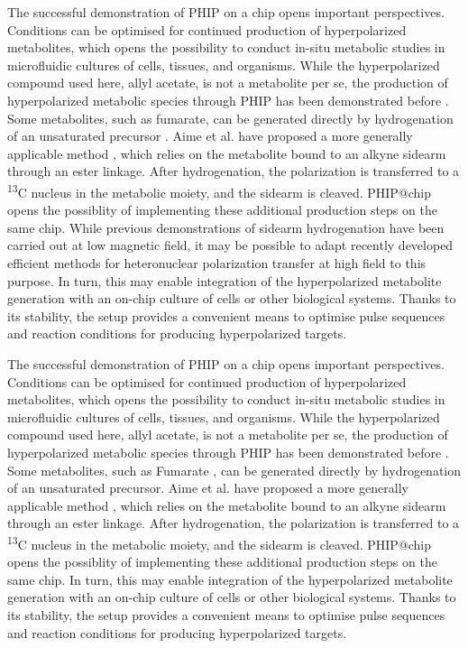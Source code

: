 The successful demonstration of PHIP on a chip opens important perspectives.
Conditions can be optimised for continued production of hyperpolarized metabolites,
which opens the possibility to conduct in-situ metabolic studies in microfluidic
cultures of cells, tissues, and organisms.
While the hyperpolarized compound used here, allyl acetate, is not
a metabolite per se, the production of hyperpolarized metabolic species
through PHIP has been demonstrated before \cite{cavallari201813,shchepin2014parahydrogen,reineri2015parahydrogen,Ripka:2018dc,Korchak:2018ga,hovener2018parahydrogen}.
Some metabolites, such as fumarate, can be
generated directly by hydrogenation
of an unsaturated precursor \cite{Ripka:2018dc}. Aime et al. have proposed a more generally
applicable method \cite{reineri2015parahydrogen}, which relies on the metabolite bound to an alkyne sidearm
through an ester linkage. After hydrogenation, the polarization is  transferred to a
\textsuperscript{13}C nucleus in the metabolic moiety, and the sidearm is
cleaved.  PHIP@chip opens the possiblity of implementing these additional
production steps on the same chip. While previous demonstrations of sidearm hydrogenation have been carried
out at low magnetic field, it may be possible to adapt recently developed
efficient methods for heteronuclear polarization transfer at
high field\cite{eills2017singlet} to this purpose.
In turn, this may enable integration
of the hyperpolarized metabolite generation with an on-chip culture
of cells or other biological systems.
Thanks to its stability,
the setup provides a convenient means to optimise pulse sequences
and reaction conditions for producing hyperpolarized targets.

The successful demonstration of PHIP on a chip opens important perspectives.
Conditions can be optimised for continued production of hyperpolarized metabolites,
which opens the possibility to conduct in-situ metabolic studies in microfluidic
cultures of cells, tissues, and organisms.
While the hyperpolarized compound used here, allyl acetate, is not
a metabolite per se, the production of hyperpolarized metabolic species
through PHIP has been demonstrated before \cite{cavallari201813,shchepin2014parahydrogen,reineri2015parahydrogen,Ripka:2018dc,Korchak:2018ga,Hovener:2018cg}.
Some metabolites, such as Fumarate \cite{Ripka:2018dc}, can be
 generated directly by hydrogenation
of an unsaturated precursor. Aime et al. have proposed a more generally
applicable method \cite{reineri2015parahydrogen}, which relies on the metabolite bound to an alkyne sidearm
through an ester linkage. After hydrogenation, the polarization is  transferred to a
 \textsuperscript{13}C nucleus in the metabolic moiety, and the sidearm is
 cleaved. PHIP@chip opens the possiblity of implementing these additional
production steps on the same chip. In turn, this may enable integration
of the hyperpolarized metabolite generation with an on-chip culture
of cells or other biological systems.
Thanks to its stability,
the setup provides a convenient means to optimise pulse sequences
and reaction conditions for producing hyperpolarized targets.
